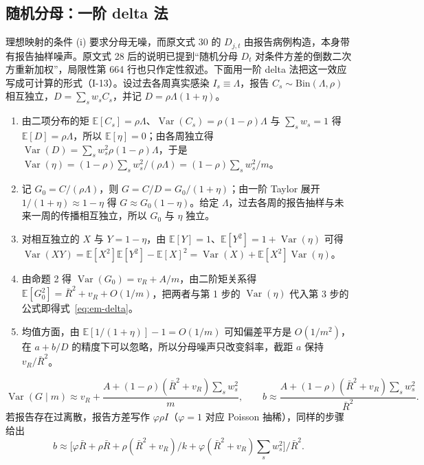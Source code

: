 \subsection{随机分母：一阶 delta 法}\label{sec:em-delta}

理想映射的条件 (i) 要求分母无噪，而原文式 30 的 $D_{j,t}$ 由报告病例构造，本身带有报告抽样噪声。原文式 28 后的说明已提到“随机分母 $D_t$ 对条件方差的倒数二次方重新加权”，局限性第 664 行也只作定性叙述。下面用一阶 delta 法把这一效应写成可计算的形式（I-13）。设过去各周真实感染 $I_s\equiv\Lambda$，报告 $C_s\sim\mathrm{Bin}(\Lambda,\rho)$ 相互独立，$D=\sum_s w_sC_s$，并记 $D=\rho\Lambda(1+\eta)$。
\begin{enumerate}
\item 由二项分布的矩 $\mathbb{E}[C_s]=\rho\Lambda$、$\operatorname{Var}(C_s)=\rho(1-\rho)\Lambda$ 与 $\sum_s w_s=1$ 得 $\mathbb{E}[D]=\rho\Lambda$，所以 $\mathbb{E}[\eta]=0$；由各周独立得 $\operatorname{Var}(D)=\sum_s w_s^2\rho(1-\rho)\Lambda$，于是 $\operatorname{Var}(\eta)=(1-\rho)\sum_s w_s^2/(\rho\Lambda)=(1-\rho)\sum_s w_s^2/m$。
\item 记 $G_0=C/(\rho\Lambda)$，则 $G=C/D=G_0/(1+\eta)$；由一阶 Taylor 展开 $1/(1+\eta)\approx1-\eta$ 得 $G\approx G_0(1-\eta)$。给定 $\Lambda$，过去各周的报告抽样与未来一周的传播相互独立，所以 $G_0$ 与 $\eta$ 独立。
\item 对相互独立的 $X$ 与 $Y=1-\eta$，由 $\mathbb{E}[Y]=1$、$\mathbb{E}[Y^2]=1+\operatorname{Var}(\eta)$ 可得 $\operatorname{Var}(XY)=\mathbb{E}[X^2]\mathbb{E}[Y^2]-\mathbb{E}[X]^2=\operatorname{Var}(X)+\mathbb{E}[X^2]\operatorname{Var}(\eta)$。
\item 由命题 2 得 $\operatorname{Var}(G_0)=v_R+A/m$，由二阶矩关系得 $\mathbb{E}[G_0^2]=\bar R^2+v_R+O(1/m)$，把两者与第 1 步的 $\operatorname{Var}(\eta)$ 代入第 3 步的公式即得式~\ref{eq:em-delta}。
\item 均值方面，由 $\mathbb{E}[1/(1+\eta)]-1=O(1/m)$ 可知偏差平方是 $O(1/m^2)$，在 $a+b/D$ 的精度下可以忽略，所以分母噪声只改变斜率，截距 $a$ 保持 $v_R/\bar R^2$。
\end{enumerate}
\begin{equation}\label{eq:em-delta}
\operatorname{Var}(G\mid m)\approx v_R+\frac{A+(1-\rho)(\bar R^2+v_R)\sum_s w_s^2}{m},
\qquad
b\approx\frac{A+(1-\rho)(\bar R^2+v_R)\sum_s w_s^2}{\bar R^2}.
\end{equation}
若报告存在过离散，报告方差写作 $\varphi\rho I$（$\varphi=1$ 对应 Poisson 抽稀），同样的步骤给出
\begin{equation*}
b\approx\big[\varphi\bar R+\rho\bar R+\rho(\bar R^2+v_R)/k+\varphi(\bar R^2+v_R)\textstyle\sum_s w_s^2\big]/\bar R^2 .
\end{equation*}


